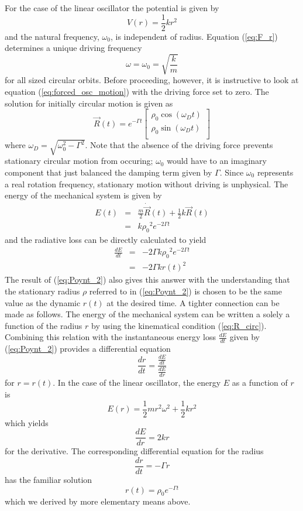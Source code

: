 For the case of the linear oscillator the potential is given by 
\[
  V(r) = \frac{1}{2}k r^2
\]
and the natural frequency, $\omega_0$, is independent of radius.  
Equation (\ref{eq:F_r}) determines a unique driving frequency
\[
  \omega = \omega _0 = \sqrt{ \frac{k}{m}}
\]
 for 
all sized circular orbits.  
Before proceeding, however, it is instructive to look at equation 
(\ref{eq:forced_osc_motion}) with the driving force set to zero.  
The solution for initially circular motion is given as
\[
{\vec R}(t) = e^{-\Gamma t} 
                  \left[
			       \begin{array}{c}
			         \rho _0 \cos( \omega _D t) \\
					 \rho _0 \sin( \omega _D t) \\
    		       \end{array}
			      \right]
\]
where $\omega_D = \sqrt{\omega_0^2 - \Gamma^2}$.
Note that the absence of the driving force prevents stationary 
circular motion from occuring; $\omega_0$ would have to an 
imaginary component that just balanced the damping term given 
by $\Gamma$.
Since $\omega_0$ represents a real rotation frequency, stationary
motion without driving is unphysical.  
The energy of the mechanical system is given by
\begin{eqnarray*}
  E(t) & = & \frac{m}{2}{\dot {\vec R}}(t) + 
             \frac{1}{2} k {\vec R}(t) \\
       & = & k {\rho _0}^2 e^{-2 \Gamma t}
\end{eqnarray*}
and the radiative loss can be directly calculated to yield
\begin{eqnarray*}
  \frac{d E}{d t} & = & -2 \Gamma k {\rho _0}^2 e^{-2 \Gamma t} \\
                  & = & -2 \Gamma k r(t)^2
\end{eqnarray*}
The result of (\ref{eq:Poynt_2}) also gives this answer with the 
understanding that the stationary radius $\rho$ referred to in
(\ref{eq:Poynt_2}) is chosen to be the same value as the dynamic
$r(t)$ at the desired time.  
A tighter connection can be made as follows.
The energy of the mechanical system can be written a solely a 
function of the radius $r$ by using the kinematical condition 
(\ref{eq:R_circ}).  
Combining this relation with the instantaneous energy loss 
$\frac{dE}{dt}$ given by (\ref{eq:Poynt_2}) provides a differential 
equation 
\begin{equation}\label{eq:dr_dt}
 \frac{dr}{dt} = \frac{ \frac{dE}{dt} }{ \frac{dE}{dr}}
\end{equation}
for $r = r(t)$.  
In the case of the linear oscillator, the energy $E$ as a 
function of $r$ is 
\[
  E(r) = \frac{1}{2} m r^2 \omega^2 + \frac{1}{2}k r^2
\]
which yields 
\[
  \frac{dE}{dr} = 2 k r
\]
for the derivative.
The corresponding differential equation for the radius
\[
  \frac{dr}{dt} = -\Gamma r
\] 
has the familiar solution 
\[
  r(t) = \rho _0 e^{-\Gamma t}
\] 
which we derived by more elementary means above.

